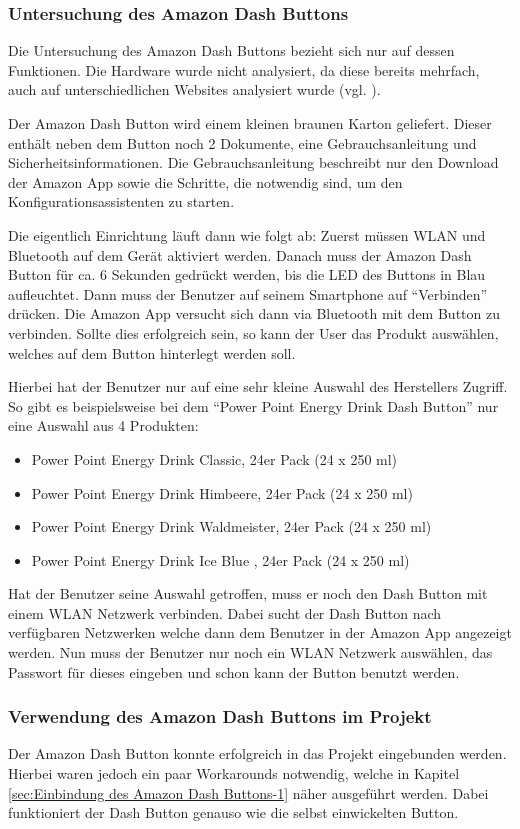 \subsubsection{Untersuchung des Amazon Dash Buttons}
\label{sec:Untersuchung des Amazon Dash Buttons}
Die Untersuchung des Amazon Dash Buttons bezieht sich nur auf dessen Funktionen.
Die Hardware wurde nicht analysiert, da diese bereits mehrfach, auch auf unterschiedlichen Websites analysiert wurde (vgl. \cite{.17.05.2017}\cite{.17.05.2017b}).

Der Amazon Dash Button wird einem kleinen braunen Karton geliefert.
Dieser enthält neben dem Button noch 2 Dokumente, eine Gebrauchsanleitung und Sicherheitsinformationen.
Die Gebrauchsanleitung beschreibt nur den Download der Amazon App sowie die Schritte, die notwendig sind, um den Konfigurationsassistenten zu starten.

Die eigentlich Einrichtung läuft dann wie folgt ab:
Zuerst müssen \ac{WLAN} und Bluetooth auf dem Gerät aktiviert werden.
Danach muss der Amazon Dash Button für ca. 6 Sekunden gedrückt werden, bis die LED des Buttons in Blau aufleuchtet.
Dann muss der Benutzer auf seinem Smartphone auf "`Verbinden"' drücken.
Die Amazon App versucht sich dann via Bluetooth mit dem Button zu verbinden.
Sollte dies erfolgreich sein, so kann der User das  Produkt auswählen, welches auf dem Button hinterlegt werden soll.

Hierbei hat der Benutzer nur auf eine sehr kleine Auswahl des Herstellers Zugriff.
So gibt es beispielsweise bei dem "`Power Point Energy Drink Dash Button"' nur eine Auswahl aus 4 Produkten:
\begin{itemize}
\item Power Point Energy Drink Classic, 24er Pack (24 x 250 ml)
\item Power Point Energy Drink Himbeere, 24er Pack (24 x 250 ml)
\item Power Point Energy Drink Waldmeister, 24er Pack (24 x 250 ml)
\item Power Point Energy Drink Ice Blue , 24er Pack (24 x 250 ml) 
\end{itemize}
Hat der Benutzer seine Auswahl getroffen, muss er noch den Dash Button mit einem \ac{WLAN} Netzwerk verbinden.
Dabei sucht der Dash Button nach verfügbaren Netzwerken welche dann dem Benutzer in der Amazon App angezeigt werden.
Nun muss der Benutzer nur noch ein \ac{WLAN} Netzwerk auswählen, das Passwort für dieses eingeben und schon kann der Button benutzt werden.

\subsubsection{Verwendung des Amazon Dash Buttons im Projekt}
\label{sec:Verwendung des Amazon Dash Buttons im Projekt}
Der Amazon Dash Button konnte erfolgreich in das Projekt eingebunden werden. Hierbei waren jedoch ein paar Workarounds notwendig, welche in Kapitel \ref{sec:Einbindung des Amazon Dash Buttons-1} näher ausgeführt werden. Dabei funktioniert der Dash Button genauso wie die selbst einwickelten Button.